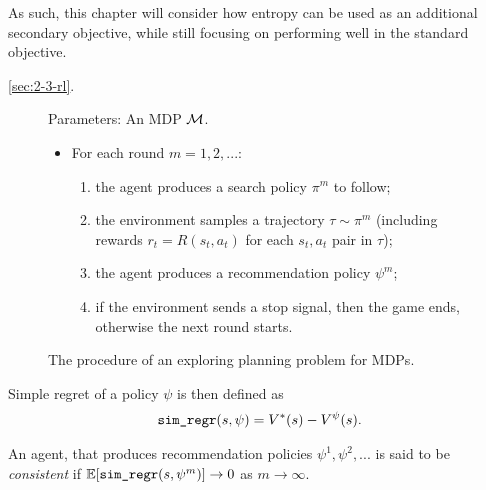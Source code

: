     As such, this chapter will consider how entropy can be used as an additional secondary objective, while still focusing on performing well in the standard objective.




     \ref{sec:2-3-rl}. 

    \begin{figure}
        \begin{tcolorbox}
            Parameters: An MDP $\mathcal{M}$.
            \begin{itemize}
                \item For each round $m=1,2,...$:
                \begin{enumerate}
                    \item the agent produces a search policy $\pi^m$ to follow;
                    \item the environment samples a trajectory $\tau\sim\pi^m$ (including rewards $r_t=R(s_t,a_t)$ for each $s_t,a_t$ pair in $\tau$);
                    \item the agent produces a recommendation policy $\psi^m$;
                    \item if the environment sends a stop signal, then the game ends, otherwise the next round starts.
                \end{enumerate} 
            \end{itemize}
        \end{tcolorbox}
        \caption{The procedure of an exploring planning problem for MDPs.  }
        \label{fig:3:planning_problem}
    \end{figure}

    Simple regret of a policy $\psi$ is then defined as
    \begin{align}
        {\textnormal{\texttt{sim\_regr}}}(s,\psi) = V^*(s)-V^{\psi}(s).
    \end{align}

    An agent, that produces recommendation policies $\psi^1,\psi^2,...$ is said to be \textit{consistent} if $\mathbb{E}[{\textnormal{\texttt{sim\_regr}}}(s,\psi^m)] \rightarrow 0$ as $m\rightarrow \infty$.









